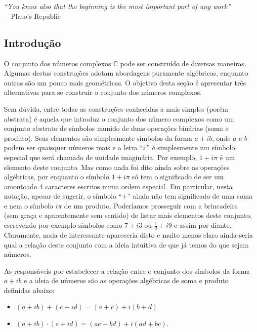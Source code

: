 \chapter[Semana 1]{}
\chaptermark{}


\hfill%
\begin{minipage}{10cm}
\begin{flushright}
\rightskip=0.5cm
\textit{``You know also that the beginning is the most important part of any work''}
\\[0.1cm]
\rightskip=0.5cm
---Plato's Republic
\end{flushright}
\end{minipage}


\section{Introdução}

O conjunto dos números complexos $\mathbb{C}$
pode ser construído de diversas maneiras.
Algumas destas construções adotam abordagens puramente algébricas,
enquanto outras são um pouco mais geométricas. O objetivo desta seção 
é apresentar três alternativas para se construir o conjunto dos números complexos. 

Sem dúvida, entre todas as construções conhecidas a mais simples (porém abstrata) é aquela que introduz 
o conjunto dos número complexos como um conjunto abstrato de símbolos munido de duas operações binárias (soma e produto). 
Seus elementos são simplesmente símbolos da forma $a+ib$, onde $a$ e $b$ podem ser quaisquer números reais 
e a letra ``$i$\,'' é simplesmente um símbolo especial que será chamado de 
unidade imaginária. 
Por exemplo, $1+i\pi$ é um elemento deste conjunto. Mas como nada foi dito ainda sobre as operações algébricas, 
por enquanto o símbolo $1+i\pi$ só tem o significado de ser um amontoado 
4 caracteres escritos numa ordem especial. Em particular, nesta notação, apesar de sugerir, 
o símbolo ``$+$'' ainda não tem significado de uma soma e nem o símbolo $i\pi$
de um produto. Poderíamos prosseguir com a brincadeira 
(sem graça e aparentemente sem sentido) de listar mais elementos deste conjunto, escrevendo por exemplo símbolos como
$7+i3$ ou $\frac{1}{2}+i9$ e assim por diante. 
Claramente, nada de interessante apareceria disto e muito menos claro ainda seria qual a 
relação deste conjunto com a ideia intuitiva de que já temos do que sejam números. 

As responsáveis por estabelecer a relação entre o conjunto dos símbolos da forma $a+ib$ e a ideia de números 
são as operações algébricas de soma e produto definidas abaixo:
\begin{itemize}
\item $(a+ib)+(c+id) = (a+c)+i(b+d)$
\item $(a+ib)\cdot (c+id) = (ac-bd)+i(ad+bc)$.
\end{itemize}

